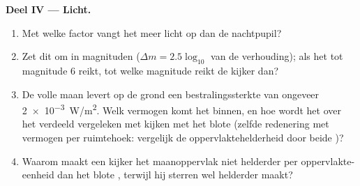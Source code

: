 \begin{problem}
\medskip
\noindent\textbf{Deel IV --- Licht.}
\begin{enumerate}[resume]
  \item Met welke factor vangt het  meer licht op dan de
        nachtpupil?
  \item Zet dit om in magnituden ($\Delta m = 2.5\log_{10}$ van de
        verhouding); als het  tot magnitude $6$ reikt, tot welke
        magnitude reikt de kijker dan?
  \item De volle maan levert op de grond een bestralingssterkte van
        ongeveer \qty{2e-3}{W/m^2}. Welk vermogen komt het
         binnen, en hoe wordt het over het  verdeeld
        vergeleken met kijken met het blote  (zelfde redenering met
        vermogen per ruimtehoek: vergelijk de oppervlaktehelderheid door
        beide )?
  \item Waarom maakt een kijker het maanoppervlak niet helderder per
        oppervlakte-eenheid dan het blote , terwijl hij sterren wel
        helderder maakt?
\end{enumerate}


\end{problem}
